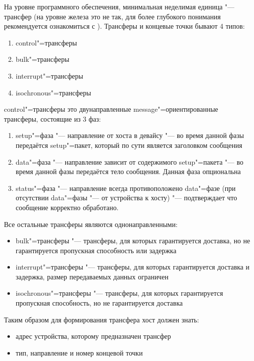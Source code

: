 \documentclass[10pt, a5paper]{article}
\begin{document}
На уровне программного обеспечения, минимальная неделимая единица "--- трансфер (на уровне железа это не так, для более глубокого понимания рекомендуется ознакомиться с \cite{Anar1}). Трансферы и концевые точки бывают 4 типов:

\begin{enumerate}
  \item control"=трансферы
  \item bulk"=трансферы
  \item interrupt"=трансферы
  \item isochronous"=трансферы
\end{enumerate}

control"=трансферы это двунаправленные message"=ориентированные трансферы, состоящие из 3 фаз:

\begin{enumerate}
  \item setup"=фаза "--- направление от хоста в девайсу "--- во время данной фазы передаётся setup"=пакет, который по сути является заголовком сообщения
  \item data"=фаза "--- направление зависит от содержимого setup"=пакета "--- во время данной фазы передаётся тело сообщения. Данная фаза опциональна
  \item status"=фаза "--- направление всегда противоположено data"=фазе (при отсутствии data"=фазы "--- от устройства к хосту) "--- подтверждает что сообщение корректно обработано.
\end{enumerate}

Все остальные трансферы являются однонаправленными:

\begin{itemize}
  \item bulk"=трансферы "--- трансферы, для которых гарантируется доставка, но не гарантируется пропускная способность или задержка
  \item interrupt"=трансферы "--- трансферы, для которых гарантируется доставка и задержка, размер передаваемых данных ограничен
  \item isochronous"=трансферы "--- трансферы, для которых гарантируется пропускная способность, но не гарантируется доставка
\end{itemize}

Таким образом для формирования трансфера хост должен знать:

\begin{itemize}
  \item адрес устройства, которому предназначен трансфер
  \item тип, направление и номер концевой точки
\end{itemize}
\end{document}
